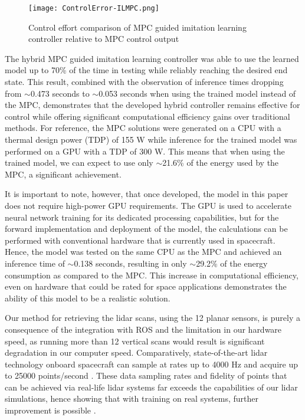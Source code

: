 \documentclass[twocolumn,letterpaper]{IEEEAerospaceCLS}
\begin{document}
\begin{figure*}
    \centering
    \texttt{[image: ControlError-ILMPC.png]}
    \caption{Control effort comparison of MPC guided imitation learning controller relative to MPC control output}
    \label{fig:ControlErrorComparisons}
\end{figure*}

The hybrid MPC guided imitation learning controller was able to use the learned model up to 70\% of the time in testing while reliably reaching the desired end state. This result, combined with the observation of inference times dropping from $\sim$0.473 seconds to $\sim$0.053 seconds when using the trained model instead of the MPC, demonstrates that the developed hybrid controller remains effective for control while offering significant computational efficiency gains over traditional methods. For reference, the MPC solutions were generated on a CPU with a thermal design power (TDP) of 155 W while inference for the trained model was performed on a GPU with a TDP of 300 W. This means that when using the trained model, we can expect to use only $\sim$21.6\% of the energy used by the MPC, a significant achievement.

It is important to note, however, that once developed, the model in this paper does not require high-power GPU requirements. The GPU is used to accelerate neural network training for its dedicated processing capabilities, but for the forward implementation and deployment of the model, the calculations can be performed with conventional hardware that is currently used in spacecraft. Hence, the model was tested on the same CPU as the MPC and achieved an inference time of $\sim$0.138 seconds, resulting in only $\sim$29.2\% of the energy consumption as compared to the MPC. This increase in computational efficiency, even on hardware that could be rated for space applications demonstrates the ability of this model to be a realistic solution. 

Our method for retrieving the lidar scans, using the 12 planar sensors, is purely a consequence of the integration with ROS and the limitation in our hardware speed, as running more than 12 vertical scans would result is significant degradation in our computer speed. Comparatively, state-of-the-art lidar technology onboard spacecraft can sample at rates up to 4000 Hz and acquire up to 25000 points/second \cite{lidar-ommatidia}. These data sampling rates and fidelity of points that can be achieved via real-life lidar systems far exceeds the capabilities of our lidar simulations, hence showing that with training on real systems, further improvement is possible \cite{survey-lidar,acp-11-7045-2011}. 
\end{document}
